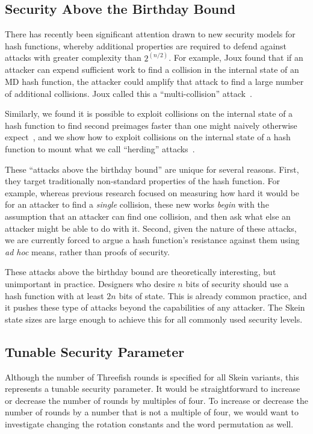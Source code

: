 \documentclass[11pt,twoside]{article}
\begin{document}
\subsection{Security Above the Birthday Bound}\label{sec:birthday}

There has recently been significant attention drawn to new security models for hash functions, whereby additional properties are required to defend against attacks with greater complexity than $2^{(n/2)}$.  For example, Joux found that if an attacker can expend sufficient work to find a collision in the internal state of an MD hash function, the attacker could amplify that attack to find a large number of additional collisions.  Joux called this a ``multi-collision'' attack~\cite{J04}.

Similarly, we found it is possible to exploit collisions on the internal state of a hash function to find second preimages faster than one might naively otherwise  expect~\cite{KS05}, and we show how to exploit collisions on the internal state of a hash function to mount what we call ``herding'' attacks~\cite{KK06}.

These ``attacks above the birthday bound'' are unique for several reasons.  First, they target traditionally non-standard properties of the hash function.  For example, whereas previous research focused on measuring how hard it would be for an attacker to find a \emph{single} collision, these new works \emph{begin} with the assumption that an attacker can find one collision, and then ask what else an attacker might be able to do with it.  Second, given the nature of these attacks, we are currently forced to argue a hash function's resistance against them using \emph{ad hoc} means, rather than proofs of security.

These attacks above the birthday bound are theoretically interesting, but unimportant in practice. Designers who desire $n$ bits of security should use a hash function with at least $2n$ bits of state. This is already common practice, and it pushes these type of attacks beyond the capabilities of any attacker. The Skein state sizes are large enough to achieve this for all commonly used security levels.

\subsection{Tunable Security Parameter}

Although the number of Threefish rounds is specified for all Skein variants, this represents a tunable security parameter.  It would be straightforward to increase or decrease the number of rounds by multiples of four. To increase or decrease the number of rounds by a number that is not a multiple of four, we would want to investigate changing the rotation constants and the word permutation as well.
\end{document}
